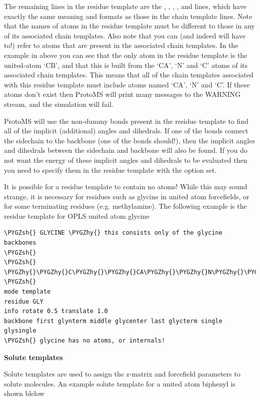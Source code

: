 \documentclass[letterpaper,10pt,english]{sphinxmanual}
\def\PYGZsh{\char`\#}
\def\PYGZhy{\char`\-}
\begin{document}
The remaining lines in the residue template are the , , , ,  and  lines, which have exactly the same meaning and formats as those in the chain template lines. Note that the names of atoms in the residue template must be different to those in any of its associated chain templates. Also note that you can (and indeed will have to!) refer to atoms that are present in the associated chain templates. In the example in above you can see that the only atom in the residue template is the united-atom ‘CB’, and that this is built from the ‘CA’, ‘N’ and ‘C’ atoms of its associated chain templates. This means that all of the chain templates associated with this residue template must include atoms named ‘CA’, ‘N’ and ‘C’. If these atoms don’t exist then ProtoMS will print many messages to the WARNING stream, and the simulation will fail.

ProtoMS will use the non-dummy bonds present in the residue template to find all of the implicit (additional) angles and dihedrals. If one of the bonds connect the sidechain to the backbone (one of the bonds should!), then the implicit angles and dihedrals between the sidechain and backbone will also be found. If you do not want the energy of these implicit angles and dihedrals to be evaluated then you need to specify them in the residue template with the  option set.

It is possible for a residue template to contain no atoms! While this may sound strange, it is necessary for residues such as glycine in united atom forcefields, or for some terminating residues (e.g. methylamine). The following example is the residue template for OPLS united atom glycine

\begin{Verbatim}[commandchars=\\\{\}]
\PYGZsh{} GLYCINE \PYGZhy{} this consists only of the glycine backbones
\PYGZsh{}
\PYGZsh{}    \PYGZhy{}\PYGZhy{}C\PYGZhy{}\PYGZhy{}CA\PYGZhy{}\PYGZhy{}N\PYGZhy{}\PYGZhy{}
\PYGZsh{}
mode template
residue GLY
info rotate 0.5 translate 1.0
backbone first glynterm middle glycenter last glycterm single glysingle
\PYGZsh{} glycine has no atoms, or internals!
\end{Verbatim}

\textbf{Solute templates}

Solute templates are used to assign the z-matrix and forcefield parameters to solute molecules. An example solute template for a united atom biphenyl is shown blelow
\end{document}
